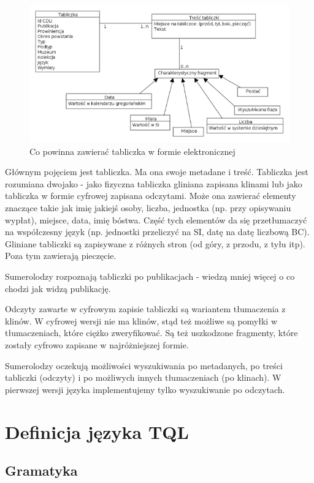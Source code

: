 \documentclass{pracamgr}
\begin{document}
\begin{figure}
 \centering
 \includegraphics[width=500px,bb=0 0 650 345]{./diagramy/Model-dziedziny.png}
 \caption{Co powinna zawierać tabliczka w formie elektronicznej}
\end{figure}

Głównym pojęciem jest tabliczka. Ma ona swoje metadane i treść. Tabliczka jest rozumiana dwojako - jako fizyczna tabliczka gliniana
zapisana klinami lub jako tabliczka w formie cyfrowej zapisana odczytami. Może ona zawierać elementy znaczące takie jak imię jakiejś 
osoby, liczba, jednostka (np. przy opisywaniu wypłat), miejsce, data, imię bóstwa. Część tych elementów da się przetłumaczyć na 
współczesny język (np. jednostki przeliczyć na SI, datę na datę liczbową BC). Gliniane tabliczki są zapisywane z różnych stron 
(od góry, z przodu, z tyłu itp). Poza tym zawierają pieczęcie. 

Sumerolodzy rozpoznają tabliczki po publikacjach - wiedzą mniej więcej o co chodzi jak widzą publikację.

Odczyty zawarte w cyfrowym zapisie tabliczki są wariantem tłumaczenia z klinów. W cyfrowej wersji nie ma klinów, stąd też możliwe
są pomyłki w tłumaczeniach, które ciężko zweryfikować. Są też uszkodzone fragmenty, które zostały cyfrowo zapisane w najróżniejszej
formie.

Sumerolodzy oczekują możliwości wyszukiwania po metadanych, po treści tabliczki (odczyty) i po możliwych innych tłumaczeniach (po klinach).
W pierwszej wersji języka implementujemy tylko wyszukiwanie po odczytach.
\chapter{Definicja języka TQL}
\section{Gramatyka}
\end{document}
